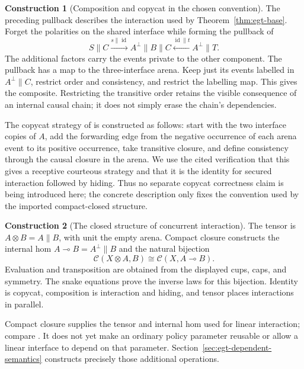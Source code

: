 \documentclass[11pt,a4paper]{article}
\numberwithin{equation}{section}
\theoremstyle{definition}
\newtheorem{construction}[construction]{Construction}
\theoremstyle{remark}
\theoremstyle{plain}
\begin{document}
\begin{construction}[Composition and copycat in the chosen convention]
The preceding pullback describes the interaction used by
Theorem~\ref{thm:egt-base}. Forget the polarities on the shared interface
while forming the pullback of
\[
 S\parallel C\xrightarrow{s\parallel\operatorname{id}}
 A^\perp\parallel B\parallel C
 \xleftarrow{\operatorname{id}\parallel t} A^\perp\parallel T.
\]
The additional factors carry the events private to the other component.
The pullback has a map to the three-interface arena. Keep just its events
labelled in $A^\perp\parallel C$, restrict order and consistency, and
restrict the labelling map. This gives the composite. Restricting the
transitive order retains the visible consequence of an internal causal
chain; it does not simply erase the chain's dependencies.

The copycat strategy of \citet{CastellanEtAl2017} is constructed as follows: start with the two interface copies of $A$, add
the forwarding edge from the negative occurrence of each arena event to its
positive occurrence, take transitive closure, and define consistency through
the causal closure in the arena. We use the cited verification that this gives
a receptive courteous strategy and that it is the identity for secured
interaction followed by hiding. Thus no separate copycat correctness claim is
being introduced here; the concrete description only fixes the convention
used by the imported compact-closed structure.
\end{construction}

\begin{construction}[The closed structure of concurrent interaction]
The tensor is $A\otimes B=A\parallel B$, with unit the empty arena.
Compact closure constructs the internal hom
$A\multimap B=A^\perp\parallel B$ and the natural bijection
\[
 \mathcal C(X\otimes A,B)\cong\mathcal C(X,A\multimap B).
\]
Evaluation and transposition are obtained from the displayed cups, caps,
and symmetry. The snake equations prove the inverse laws for this
bijection. Identity is copycat, composition is interaction and hiding,
and tensor places interactions in parallel.
\end{construction}

Compact closure supplies the tensor and internal hom used for linear
interaction; compare \citet{Girard1987}. It does not yet make an ordinary
policy parameter reusable or allow a linear interface to depend on that
parameter. Section~\ref{sec:egt-dependent-semantics} constructs precisely
those additional operations.
\end{document}
